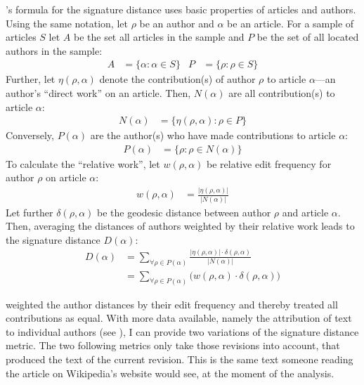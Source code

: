 \citeauthor{hardy2011volunteered}'s formula for the signature distance uses basic properties of articles and authors.
Using the same notation, let $\rho$ be an author and $\alpha$ be an article.
For a sample of articles $S$ let $A$ be the set all articles in the sample and $P$ be the set of all located authors in the sample:
\begin{align*}
A &= \{\alpha : \alpha \in S\} &P &= \{\rho : \rho \in S\}
\end{align*}
Further, let $\eta(\rho,\alpha)$ denote the contribution(s) of author $\rho$ to article $\alpha$---an author's ``direct work'' on an article\cite{kittur2007he}.
Then, $N(\alpha)$ are all contribution(s) to article $\alpha$:
\begin{align*}
N(\alpha) &= \{\eta(\rho,\alpha) : \rho \in P\}
\end{align*}
Conversely, $P(\alpha)$ are the author(s) who have made contributions to article $\alpha$:
\begin{align*}
P(\alpha) &= \{\rho : \rho \in N(\alpha)\}
\end{align*}
To calculate the ``relative work''\cite[52]{hardy2011volunteered}, let $w(\rho,\alpha)$ be relative edit frequency for author $\rho$ on article $\alpha$:
\begin{align*}
w(\rho,\alpha) &= \frac{|\eta(\rho,\alpha)|}{|N(\alpha)|}
\end{align*}
Let further $\delta(\rho,\alpha)$ be the geodesic distance between author $\rho$ and article $\alpha$.
Then, averaging the distances of authors weighted by their relative work leads to the signature distance $D(\alpha)$:
\begin{equation}\label{eqn:sigdist}
\begin{split}
D(\alpha) &= \sum_{\forall \rho \in P(\alpha)} \frac{|\eta(\rho,\alpha)| \cdot \delta(\rho,\alpha)}{|N(\alpha)|} \\
 &=  \sum_{\forall \rho \in P(\alpha)} \big(w(\rho,\alpha) \cdot \delta(\rho,\alpha)\big)
 \end{split}
\end{equation}

\citeauthor{hardy2011volunteered} weighted the author distances by their edit frequency and thereby treated all contributions as equal.
With more data available, namely the attribution of text to individual authors (see ), I can provide two variations of the signature distance metric.
The two following metrics only take those revisions into account, that produced the text of the current revision.
This is the same text someone reading the article on Wikipedia's website would see, at the moment of the analysis. 

